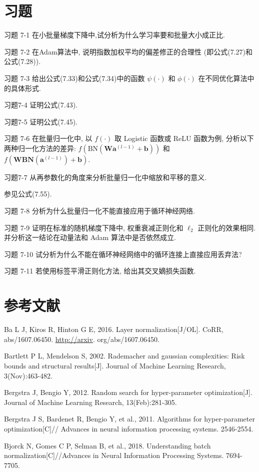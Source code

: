 \documentclass[10pt]{article}
\begin{document}
\section*{习题}
习题 7-1 在小批量梯度下降中,试分析为什么学习率要和批量大小成正比.

习题 7-2 在Adam算法中, 说明指数加权平均的偏差修正的合理性 (即公式(7.27)和公式(7.28)).

习题 7-3 给出公式(7.33)和公式(7.34)中的函数 $\psi(\cdot)$ 和 $\phi(\cdot)$ 在不同优化算法中的具体形式.

习题7-4 证明公式(7.43).

习题7-5 证明公式(7.45).

习题 7-6 在批量归一化中, 以 $f(\cdot)$ 取 Logistic 函数或 ReLU 函数为例, 分析以下两种归一化方法的差异: $f\left(\mathrm{BN}\left(\boldsymbol{W} \boldsymbol{a}^{(l-1)}+\boldsymbol{b}\right)\right)$ 和 $f\left(\boldsymbol{W B N}\left(\boldsymbol{a}^{(l-1)}\right)+\boldsymbol{b}\right)$.

习题7-7 从再参数化的角度来分析批量归一化中缩放和平移的意义.

参见公式(7.55).

习题 7-8 分析为什么批量归一化不能直接应用于循环神经网络.

习题 7-9 证明在标准的随机梯度下降中, 权重衰减正则化和 $\ell_{2}$ 正则化的效果相同. 并分析这一结论在动量法和 Adam 算法中是否依然成立.

习题 7-10 试分析为什么不能在循环神经网络中的循环连接上直接应用丢弃法?

习题 7-11 若使用标签平滑正则化方法, 给出其交叉嫡损失函数.

\section*{参考文献}
Ba L J, Kiros R, Hinton G E, 2016. Layer normalization[J/OL]. CoRR, abs/1607.06450. \href{http://arxiv}{http://arxiv}. org/abs/1607.06450.

Bartlett P L, Mendelson S, 2002. Rademacher and gaussian complexities: Risk bounds and structural results[J]. Journal of Machine Learning Research, 3(Nov):463-482.

Bergstra J, Bengio Y, 2012. Random search for hyper-parameter optimization[J]. Journal of Machine Learning Research, 13(Feb):281-305.

Bergstra J S, Bardenet R, Bengio Y, et al., 2011. Algorithms for hyper-parameter optimization[C]// Advances in neural information processing systems. 2546-2554.

Bjorck N, Gomes C P, Selman B, et al., 2018. Understanding batch normalization[C]//Advances in Neural Information Processing Systems. 7694-7705.
\end{document}
